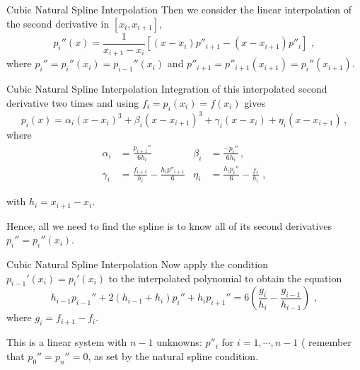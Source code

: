 \documentclass[11pt]{beamer}
\begin{document}
\begin{frame}[fragile]{Cubic Natural Spline Interpolation}
Then we consider the linear
interpolation of the second derivative in $[x_i,x_{i+1}]$,
\begin{equation}
p_i''(x) = \frac{1}{x_{i+1}-x_i} \left[ (x-x_i)p''_{i+1} - (x-x_{i+1})
  p''_i \right]\,\,,
\end{equation}
where $p_i'' = p_i''(x_i) = p_{i-1}''(x_i)$ and
$p''_{i+1} = p''_{i+1}(x_{i+1}) = p_i''(x_{i+1})$.
\end{frame}

\begin{frame}[fragile]{Cubic Natural Spline Interpolation}
Integration of this interpolated second derivative two times and using $f_i =
p_i(x_i) = f(x_i)$ gives
\begin{equation}
p_i(x) = \alpha_i (x-x_i)^3 + \beta_i (x-x_{i+1})^3 + \gamma_i (x-x_i) + 
\eta_i(x-x_{i+1})\,,
\end{equation}
where
\begin{align}
\alpha_i &= \frac{p_{i+1}''}{6 h_i} &\beta_i &= \frac{-p_i''}{6h_i}\,,\\
\gamma_i &= \frac{f_{i+1}}{h_i} - \frac{h_i p''_{i+1}}{6}
&\eta_i &= \frac{h_i p_i''}{6} - \frac{f_i}{h_i}\,\,,
\end{align}

with $h_i = x_{i+1} - x_{i}$. 
\pause
\bigskip

Hence, all we need to find the spline is
to know all of its second derivatives $p_i'' = p_i''(x_i)$.
\end{frame}

\begin{frame}[fragile]{Cubic Natural Spline Interpolation}
Now apply the condition $p_{i-1}'(x_i) = p_i'(x_i)$ to the interpolated polynomial to obtain the equation
\begin{equation}
h_{i-1}p_{i-1}'' + 2 (h_{i-1} + h_i)p_i'' + h_i p_{i+1}'' = 
6 \left( \frac{g_i}{h_i} - \frac{g_{i-1}}{h_{i-1}}\right)\,\,,
\end{equation}
where $g_i = f_{i+1} - f_i$.\\
\pause
\bigskip
 
This is a linear system with $n-1$ unknowns:
$p''_i$ for $i=1,\cdots,n-1$ ( remember that $p_0'' = p_n'' = 0$, as set by the natural
spline condition.
\end{frame}
\end{document}
